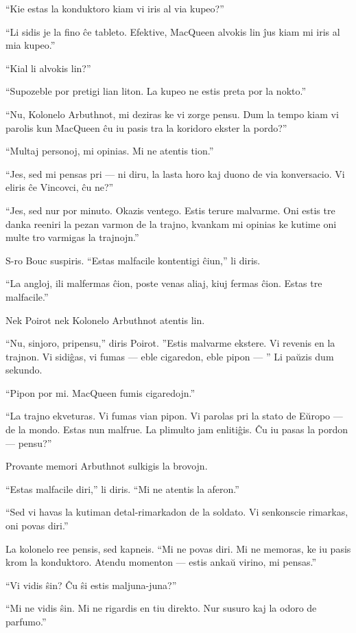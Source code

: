 ``Kie estas la konduktoro kiam vi iris al via kupeo?''

``Li sidis je la fino ĉe tableto. Efektive, MacQueen alvokis lin ĵus kiam mi iris al mia kupeo.''

``Kial li alvokis lin?''

``Supozeble por pretigi lian liton. La kupeo ne estis preta por la nokto.''

``Nu, Kolonelo Arbuthnot, mi deziras ke vi zorge pensu. Dum la tempo kiam vi parolis kun MacQueen ĉu iu pasis tra la koridoro ekster la pordo?''

``Multaj personoj, mi opinias. Mi ne atentis tion.''

``Jes, sed mi pensas pri --- ni diru, la lasta horo kaj duono de via konversacio. Vi eliris ĉe Vincovci, ĉu ne?''

``Jes, sed nur por minuto. Okazis ventego. Estis terure malvarme. Oni estis tre danka reeniri la pezan varmon de la trajno, kvankam mi opinias ke kutime oni multe tro varmigas la trajnojn.''

S-ro Bouc suspiris. ``Estas malfacile kontentigi ĉiun,'' li diris.

``La angloj, ili malfermas ĉion, poste venas aliaj, kiuj fermas ĉion. Estas tre malfacile.''

Nek Poirot nek Kolonelo Arbuthnot atentis lin.

``Nu, sinjoro, pripensu,'' diris Poirot. ''Estis malvarme ekstere. Vi revenis en la trajnon. Vi sidiĝas, vi fumas --- eble cigaredon, eble pipon --- '' Li paŭzis dum sekundo.

``Pipon por mi. MacQueen fumis cigaredojn.''

``La trajno ekveturas. Vi fumas vian pipon. Vi parolas pri la stato de Eŭropo --- de la mondo. Estas nun malfrue. La plimulto jam enlitiĝis. Ĉu iu pasas la pordon --- pensu?''

Provante memori Arbuthnot sulkigis la brovojn.

``Estas malfacile diri,'' li diris. ``Mi ne atentis la aferon.''

``Sed vi havas la kutiman detal-rimarkadon de la soldato. Vi senkonscie rimarkas, oni povas diri.''

La kolonelo ree pensis, sed kapneis. ``Mi ne povas diri. Mi ne memoras, ke iu pasis krom la konduktoro. Atendu momenton --- estis ankaŭ virino, mi pensas.''

``Vi vidis ŝin? Ĉu ŝi estis maljuna-juna?''

``Mi ne vidis ŝin. Mi ne rigardis en tiu direkto. Nur susuro kaj la odoro de parfumo.''

